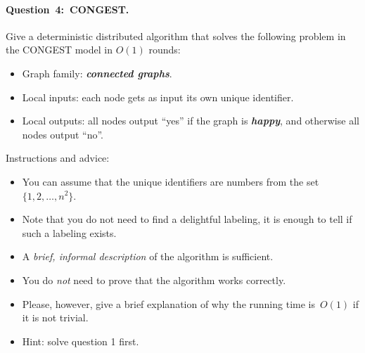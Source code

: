 \documentclass[12pt,a4paper]{article}
\newcommand{\q}[2]{\paragraph{\mbox{Question #1: }#2.}}
\newcommand{\hl}[1]{\textbf{\emph{#1}}}
\newcommand{\cemph}[1]{\textcolor{hlcolor}{\emph{#1}}}
\begin{document}
\q{4}{CONGEST}

Give a deterministic distributed algorithm that solves the following problem in the CONGEST model in $O(1)$ rounds:
\begin{itemize}
    \item Graph family: \hl{connected graphs}.
    \item Local inputs: each node gets as input its own unique identifier.
    \item Local outputs: all nodes output ``yes'' if the graph is \hl{happy}, and otherwise all nodes output ``no''.
\end{itemize}
Instructions and advice:
\begin{itemize}
    \item You can assume that the unique identifiers are numbers from the set $\{1,2,\dotsc,n^2\}$.
    \item Note that you do not need to find a delightful labeling, it is enough to tell if such a labeling exists.
    \item A \cemph{brief, informal description} of the algorithm is sufficient.
    \item You do \emph{not} need to prove that the algorithm works correctly.
    \item Please, however, give a brief explanation of why the running time is~$O(1)$ if it is not trivial.
    \item Hint: solve question 1 first.
\end{itemize}
\end{document}
